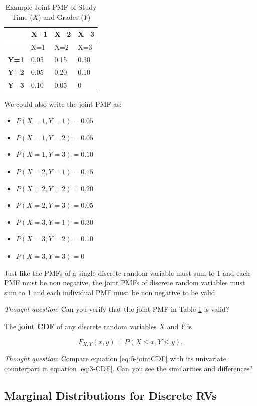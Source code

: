 \documentclass[
]{book}
\providecommand{\tightlist}{%
  \setlength{\itemsep}{0pt}\setlength{\parskip}{0pt}}
\begin{document}
\begin{longtable}[]{@{}llll@{}}
\caption{\label{tab:simple-table} Example Joint PMF of Study Time (\(X\)) and Grades (\(Y\))}\tabularnewline
\toprule\noalign{}
& X=1 & X=2 & X=3 \\
\midrule\noalign{}
\endfirsthead
\toprule\noalign{}
& X=1 & X=2 & X=3 \\
\midrule\noalign{}
\endhead
\bottomrule\noalign{}
\endlastfoot
\textbf{Y=1} & 0.05 & 0.15 & 0.30 \\
\textbf{Y=2} & 0.05 & 0.20 & 0.10 \\
\textbf{Y=3} & 0.10 & 0.05 & 0 \\
\end{longtable}

We could also write the joint PMF as:

\begin{itemize}
\tightlist
\item
  \(P(X=1, Y=1) = 0.05\)
\item
  \(P(X=1, Y=2) = 0.05\)
\item
  \(P(X=1, Y=3) = 0.10\)
\item
  \(P(X=2, Y=1) = 0.15\)
\item
  \(P(X=2, Y=2) = 0.20\)
\item
  \(P(X=2, Y=3) = 0.05\)
\item
  \(P(X=3, Y=1) = 0.30\)
\item
  \(P(X=3, Y=2) = 0.10\)
\item
  \(P(X=3, Y=3) = 0\)
\end{itemize}

Just like the PMFs of a single discrete random variable must sum to 1 and each PMF must be non negative, the joint PMFs of discrete random variables must sum to 1 and each individual PMF must be non negative to be valid.

\emph{Thought question}: Can you verify that the joint PMF in Table \ref{tab:simple-table} is valid?

The \textbf{joint CDF} of any discrete random variables \(X\) and \(Y\) is

\begin{equation} 
F_{X,Y}(x,y) = P(X \leq x, Y \leq y).
\label{eq:5-jointCDF}
\end{equation}

\emph{Thought question}: Compare equation \eqref{eq:5-jointCDF} with its univariate counterpart in equation \eqref{eq:3-CDF}. Can you see the similarities and differences?

\subsection{Marginal Distributions for Discrete RVs}\label{marginal-distributions-for-discrete-rvs}
\end{document}
